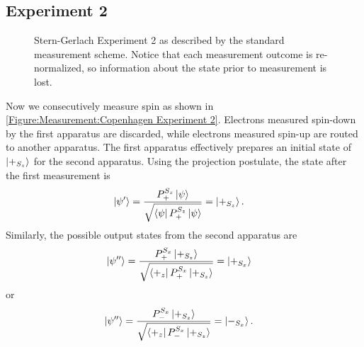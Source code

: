 \subsection{Experiment 2} \label{standard consecutive measurements}
\begin{figure}
\centering\CaptionFontSize
{}
\caption[Standard approach to Stern-Gerlach Experiment 2]
{Stern-Gerlach Experiment 2 as described by the standard measurement scheme. Notice that each measurement outcome is re-normalized, so information about the state prior to measurement is lost.}
\label{Figure:Measurement:Copenhagen Experiment 2}
\end{figure}

Now we consecutively measure spin as shown in \autoref{Figure:Measurement:Copenhagen Experiment 2}. Electrons measured spin-down by the first apparatus are discarded, while electrons measured spin-up are routed to another apparatus. The first apparatus effectively prepares an initial state of $\ket{+_{S_z}}$ for the second apparatus. Using the projection postulate, the state after the first measurement is
\begin{align}
    \ket{\psi^\prime} &= \frac{{P^{S_z}_+}\ket{\psi}}{\sqrt{\bra{\psi}P^{S_z}_+\ket{\psi}}} = \ket{+_{S_z}}.
\end{align}
Similarly, the possible output states from the second apparatus are
\begin{align}
  \ket{\psi^{\prime\prime}} &= \frac{P^{S_x}_+\ket{+_{S_z}}}{\sqrt{\bra{+_z}P^{S_x}_+\ket{+_{S_z}}}} = \ket{+_{S_x}}
\end{align}
or
\begin{align}
  \ket{\psi^{\prime\prime}} &= \frac{P^{S_x}_-\ket{+_{S_z}}}{\sqrt{\bra{+_z}P^{S_x}_-\ket{+_{S_z}}}} = \ket{-_{S_x}}.
\end{align}

